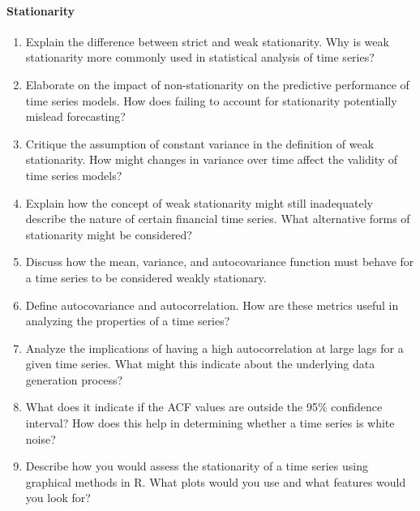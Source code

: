 \paragraph*{Stationarity}
\begin{enumerate}
    \item Explain the difference between strict and weak stationarity. Why is weak stationarity more commonly used in statistical analysis of time series?
    \item Elaborate on the impact of non-stationarity on the predictive performance of time series models. How does failing to account for stationarity potentially mislead forecasting?
    \item Critique the assumption of constant variance in the definition of weak stationarity. How might changes in variance over time affect the validity of time series models?
    \item Explain how the concept of weak stationarity might still inadequately describe the nature of certain financial time series. What alternative forms of stationarity might be considered?
    \item Discuss how the mean, variance, and autocovariance function must behave for a time series to be considered weakly stationary.
    \item Define autocovariance and autocorrelation. How are these metrics useful in analyzing the properties of a time series?
    \item Analyze the implications of having a high autocorrelation at large lags for a given time series. What might this indicate about the underlying data generation process?
    \item What does it indicate if the ACF values are outside the 95\% confidence interval? How does this help in determining whether a time series is white noise?
    \item Describe how you would assess the stationarity of a time series using graphical methods in R. What plots would you use and what features would you look for?
\end{enumerate}
